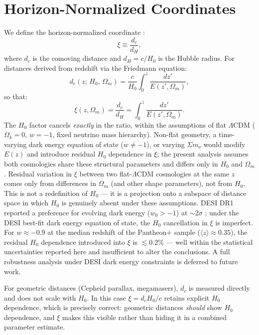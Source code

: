 \documentclass[usenatbib]{mnras}
\begin{document}
\section{Horizon-Normalized Coordinates}
\label{sec:xi}

We define the horizon-normalized coordinate \citep{martin2025}:
\begin{equation}
    \xi \equiv \frac{d_c}{d_H},
\label{eq:xi}
\end{equation}
where $d_c$ is the comoving distance and $d_H = c/H_0$ is the Hubble radius.
For distances derived from redshift via the Friedmann equation:
\begin{equation}
d_c(z;\,H_0,\,\Omega_m) = \frac{c}{H_0}\int_0^z\frac{dz'}{E(z',\Omega_m)},
\label{eq:dc}
\end{equation}
so that:
\begin{equation}
\xi(z,\Omega_m) = \frac{d_c}{d_H} = \int_0^z\frac{dz'}{E(z',\Omega_m)}.
\label{eq:xiinvariant}
\end{equation}
The $H_0$ factor cancels \emph{exactly} in the ratio, within the
assumptions of flat $\Lambda$CDM ($\Omega_k = 0$, $w = -1$, fixed
neutrino mass hierarchy). Non-flat geometry, a time-varying dark energy
equation of state ($w \neq -1$), or varying $\Sigma m_\nu$ would modify
$E(z)$ and introduce residual $H_0$ dependence in $\xi$; the present
analysis assumes both cosmologies share these structural parameters and
differs only in $H_0$ and $\Omega_m$. Residual variation in
$\xi$ between two flat-$\Lambda$CDM cosmologies at the same $z$
comes only from differences in $\Omega_m$ (and other shape parameters),
not from $H_0$. This is not a redefinition of $H_0$ --- it is a
projection onto a subspace of distance space in which $H_0$ is
genuinely absent under these assumptions. DESI DR1 reported a preference
for evolving dark energy ($w_0 > -1$) at $\sim$2$\sigma$
\citep{desi2024}; under the DESI best-fit dark energy equation of state,
the $H_0$ cancellation in $\xi$ is imperfect. For $w \approx -0.9$ at the
median redshift of the Pantheon+ sample ($\langle z\rangle \approx 0.35$),
the residual $H_0$ dependence introduced into $\xi$ is $\lesssim 0.2\%$
--- well within the statistical uncertainties reported here and
insufficient to alter the conclusions. A full robustness analysis
under DESI dark energy constraints is deferred to future work.

For geometric distances (Cepheid parallax, megamasers), $d_c$ is measured
directly and does not scale with $H_0$. In this case $\xi = d_c H_0/c$
retains explicit $H_0$ dependence, which is precisely correct: geometric
distances \emph{should} show $H_0$ dependence, and $\xi$ makes this visible
rather than hiding it in a combined parameter estimate.
\end{document}

